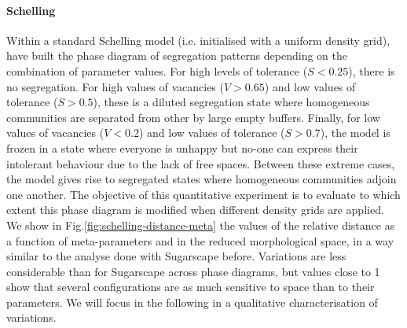 \documentclass[Royal,sageh,times]{sagej}
\begin{document}
\paragraph{Schelling} 
Within a standard Schelling model (i.e. initialised with a uniform density grid), \citet{Gauvinetal2009} have built the phase diagram of segregation patterns depending on the combination of parameter values. For high levels of tolerance ($S < 0.25$), there is no segregation. For high values of vacancies ($V > 0.65$) and low values of tolerance ($S > 0.5$), these is a diluted segregation state where homogeneous communities are separated from other by large empty buffers. Finally, for low values of vacancies ($V < 0.2$) and low values of tolerance ($S > 0.7$), the model is frozen in a state where everyone is unhappy but no-one can express their intolerant behaviour due to the lack of free spaces. Between these extreme cases, the model gives rise to segregated states where homogeneous communities adjoin one another. The objective of this quantitative experiment is to evaluate to which extent this phase diagram is modified when different density grids are applied. We show in Fig.\ref{fig:schelling-distance-meta} the values of the relative distance as a function of meta-parameters and in the reduced morphological space, in a way similar to the analyse done with Sugarscape before. Variations are less considerable than for Sugarscape across phase diagrams, but values close to 1 show that several configurations are as much sensitive to space than to their parameters. We will focus in the following in a qualitative characterisation of variations.
\end{document}
